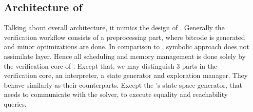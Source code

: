 \subsection{Architecture of \SymDIVINE}
Talking about \SymDIVINE overall architecture, it mimics the design of \DIVINE.
Generally the verification workflow consists of a preprocessing part, where
\LLVM bitcode is generated and minor optimizations are done. In comparison to
\DIVINE, symbolic approach does not assimilate \DIOS layer. Hence all scheduling
and memory management is done solely by the verification core of \SymDIVINE. Except
that, we may distinguish 3 parts in the verification core, an interpreter, a state
generator and exploration manager. They behave similarly as their \DIVINE
counterparts. Except the \SymDIVINE's state space generator, that needs to
communicate with the \SMT solver, to execute equality and reachability queries.

